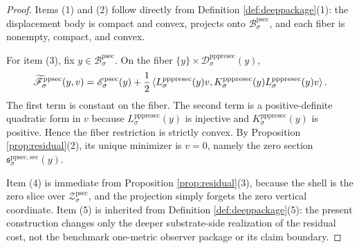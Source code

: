 \documentclass[11pt]{article}
\newcommand{\ProtoSectionBody}[1]{\mathcal B_{#1}^{\mathrm{psec}}}
\newcommand{\ProtoSectionFunctional}[1]{\mathscr E_{#1}^{\mathrm{psec}}}
\newcommand{\ProtoSectionShell}[1]{\mathcal Z_{#1}^{\mathrm{psec}}}
\newcommand{\PreProtoSectionMinSection}[1]{\mathfrak s_{#1}^{\mathrm{ppsec,sec}}}
\newcommand{\PrePreProtoSectionResidualBody}[1]{\mathcal D_{#1}^{\mathrm{pppresec}}}
\newcommand{\PrePreProtoSectionResponseMap}[1]{L_{#1}^{\mathrm{pppresec}}}
\newcommand{\PrePreProtoSectionOperator}[1]{K_{#1}^{\mathrm{pppresec}}}
\newcommand{\InducedPreProtoSectionFunctional}[1]{\widetilde{\mathscr F}_{#1}^{\mathrm{ppsec}}}
\begin{document}
\begin{proof}
Items (1) and (2) follow directly from Definition \ref{def:deeppackage}(1): the displacement body is compact and convex, projects onto \(\ProtoSectionBody{\sigma}\), and each fiber is nonempty, compact, and convex.

For item (3), fix \(y\in\ProtoSectionBody{\sigma}\). On the fiber \(\{y\}\times\PrePreProtoSectionResidualBody{\sigma}(y)\),
\[
\InducedPreProtoSectionFunctional{\sigma}(y,v)
=
\ProtoSectionFunctional{\sigma}(y)
+
\frac{1}{2}
\ev{
\PrePreProtoSectionResponseMap{\sigma}(y)v,
\PrePreProtoSectionOperator{\sigma}(y)
\PrePreProtoSectionResponseMap{\sigma}(y)v
}.
\]
The first term is constant on the fiber. The second term is a positive-definite quadratic form in \(v\) because \(\PrePreProtoSectionResponseMap{\sigma}(y)\) is injective and \(\PrePreProtoSectionOperator{\sigma}(y)\) is positive. Hence the fiber restriction is strictly convex. By Proposition \ref{prop:residual}(2), its unique minimizer is \(v=0\), namely the zero section \(\PreProtoSectionMinSection{\sigma}(y)\).

Item (4) is immediate from Proposition \ref{prop:residual}(3), because the shell is the zero slice over \(\ProtoSectionShell{\sigma}\), and the projection simply forgets the zero vertical coordinate. Item (5) is inherited from Definition \ref{def:deeppackage}(5): the present construction changes only the deeper substrate-side realization of the residual cost, not the benchmark one-metric observer package or its claim boundary.
\end{proof}
\end{document}
